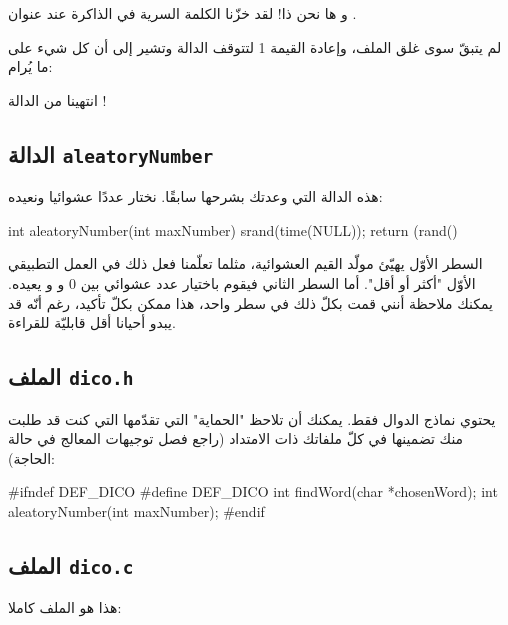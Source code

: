 و ها نحن ذا! لقد خزّنا الكلمة السرية في الذاكرة عند عنوان
.

لم يتبقّ سوى غلق الملف، وإعادة القيمة 1 لتتوقف الدالة وتشير إلى أن كل شيء على ما يُرام:

\begin{Csource}
  fclose(dico);
  return 1; // Everything is okay, return 1
}
\end{Csource}
انتهينا من الدالة
 !

\subsection{الدالة
\texttt{aleatoryNumber}}
هذه الدالة التي وعدتك بشرحها سابقًا. نختار عددًا عشوائيا ونعيده:

\begin{Csource}
int aleatoryNumber(int maxNumber)
{
    srand(time(NULL));
    return (rand() %
}
\end{Csource}

السطر الأوّل يهيّئ مولّد القيم العشوائية، مثلما تعلّمنا فعل ذلك في العمل التطبيقي الأوّل "أكثر أو أقل". أما السطر الثاني فيقوم باختيار عدد عشوائي بين $ 0 $
و
و يعيده. يمكنك ملاحظة أنني قمت بكلّ ذلك في سطر واحد، هذا ممكن بكلّ تأكيد، رغم أنّه قد يبدو أحيانا أقل قابليّة للقراءة.

\subsection{الملف \texttt{dico.h}}

يحتوي نماذج الدوال فقط. يمكنك أن تلاحظ "الحماية" التي تقدّمها
التي كنت قد طلبت منك تضمينها في كلّ ملفاتك ذات الامتداد
(راجع فصل توجيهات المعالج في حالة الحاجة):

\begin{Csource}
#ifndef DEF_DICO
#define DEF_DICO
int findWord(char *chosenWord);
int aleatoryNumber(int maxNumber);
#endif
\end{Csource}

\subsection{الملف \texttt{dico.c}}

هذا هو الملف
كاملا:

